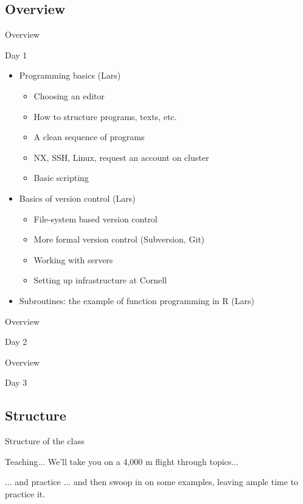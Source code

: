 \documentclass[xcolor=table,compress]{beamer}
\begin{document}
\subsection{Overview}
\begin{frame}{Overview}
\begin{block}{Day 1}
\begin{itemize}[<+->]
\item Programming basics (Lars)
\begin{itemize}
\item Choosing an editor
\item How to structure programs, texts, etc.
\item A clean sequence of programs
\item NX, SSH, Linux, request an account on cluster
\item Basic scripting
\end{itemize}
\item  Basics of version control (Lars)
\begin{itemize}
\item File-system based version control
\item More formal version control (Subversion, Git)
\item Working with servers
\item Setting up infrastructure at Cornell
\end{itemize}
\item Subroutines: the example of function programming in R (Lars)
\end{itemize}
\end{block}
\end{frame}

\begin{frame}{Overview}
\begin{block}{Day 2}

\end{block}
\end{frame}

\begin{frame}{Overview}
\begin{block}{Day 3}

\end{block}
\end{frame}

\subsection{Structure}

\begin{frame}{Structure of the class}
\begin{block}{Teaching...}
We'll take you on a 4,000 m flight through topics...
\end{block}
\pause
\begin{block}{... and practice}
... and then swoop in on some examples, leaving ample time to practice it.
\end{block}
\end{frame}
\end{document}
